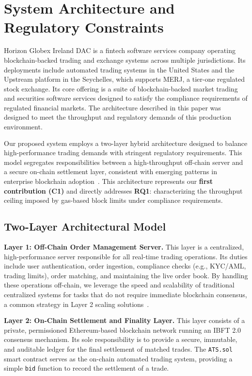 \section{System Architecture and Regulatory Constraints}
\label{sec:architecture}

Horizon Globex Ireland DAC is a fintech software services company operating blockchain-backed trading and exchange systems across multiple jurisdictions. Its deployments include automated trading systems in the United States and the Upstream platform in the Seychelles, which supports MERJ, a tier-one regulated stock exchange. Its core offering is a suite of blockchain-backed market trading and securities software services designed to satisfy the compliance requirements of regulated financial markets. The architecture described in this paper was designed to meet the throughput and regulatory demands of this production environment.

Our proposed system employs a two-layer hybrid architecture designed to balance high-performance trading demands with stringent regulatory requirements. This model segregates responsibilities between a high-throughput off-chain server and a secure on-chain settlement layer, consistent with emerging patterns in enterprise blockchain adoption~\cite{jamithireddy2025hybrid}. This architecture represents our \textbf{first contribution (C1)} and directly addresses \textbf{RQ1}: characterizing the throughput ceiling imposed by gas-based block limits under compliance requirements.

\subsection{Two-Layer Architectural Model}

\textbf{Layer 1: Off-Chain Order Management Server.} This layer is a centralized, high-performance server responsible for all real-time trading operations. Its duties include user authentication, order ingestion, compliance checks (e.g., KYC/AML, trading limits), order matching, and maintaining the live order book. By handling these operations off-chain, we leverage the speed and scalability of traditional centralized systems for tasks that do not require immediate blockchain consensus, a common strategy in Layer 2 scaling solutions~\cite{xu2021slimchain}.

\textbf{Layer 2: On-Chain Settlement and Finality Layer.} This layer consists of a private, permissioned Ethereum-based blockchain network running an IBFT 2.0 consensus mechanism. Its sole responsibility is to provide a secure, immutable, and auditable ledger for the final settlement of matched trades. The \texttt{ATS.sol} smart contract serves as the on-chain automated trading system, providing a simple \texttt{bid} function to record the settlement of a trade.

